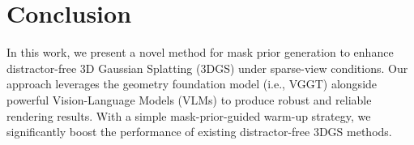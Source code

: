 \documentclass[letterpaper, 10 pt, conference]{ieeeconf}  %
\begin{document}




\section{Conclusion}
In this work, we present a novel method for mask prior generation to enhance distractor-free 3D Gaussian Splatting (3DGS) under sparse-view conditions. Our approach leverages the geometry foundation model (i.e., VGGT) alongside powerful Vision-Language Models (VLMs) to produce robust and reliable rendering results. With a simple mask-prior-guided warm-up strategy, we significantly boost the performance of existing distractor-free 3DGS methods.








\end{document}
